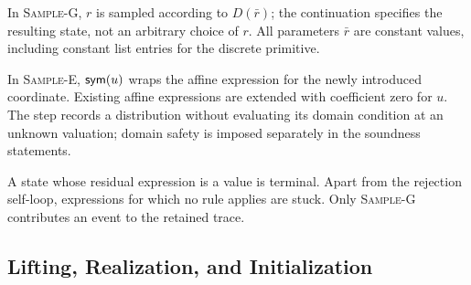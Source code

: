 In \textsc{Sample-G}, $r$ is sampled according to
$D(\bar r)$; the continuation specifies the resulting state,
not an arbitrary choice of $r$.
All parameters $\bar r$ are constant values, including
constant list entries for the discrete primitive.

In \textsc{Sample-E}, $\mathsf{sym}(u)$ wraps the affine expression
for the newly introduced coordinate. Existing affine
expressions are extended with coefficient zero for $u$.
The step records a distribution without evaluating its
domain condition at an unknown valuation; domain safety
is imposed separately in the soundness statements.

A state whose residual expression is a value is terminal.
Apart from the rejection self-loop, expressions for which
no rule applies are stuck. Only \textsc{Sample-G} contributes
an event to the retained trace.

\subsection{Lifting, Realization, and Initialization}
\label{def:appendix-symbolic-maps}

